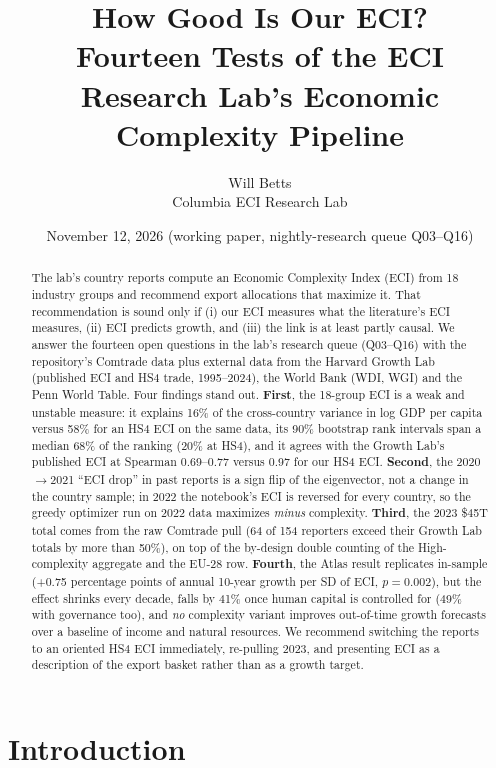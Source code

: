 \documentclass[11pt]{article}
\title{How Good Is Our ECI?\\[4pt]\large Fourteen Tests of the ECI Research Lab's Economic Complexity Pipeline}
\author{Will Betts\\Columbia ECI Research Lab}
\date{November 12, 2026 \quad (working paper, nightly-research queue Q03--Q16)}
\begin{document}
\sloppy
\maketitle

\begin{abstract}
\noindent The lab's country reports compute an Economic Complexity Index (ECI) from 18 industry groups and recommend export allocations that maximize it. That recommendation is sound only if (i) our ECI measures what the literature's ECI measures, (ii) ECI predicts growth, and (iii) the link is at least partly causal. We answer the fourteen open questions in the lab's research queue (Q03--Q16) with the repository's Comtrade data plus external data from the Harvard Growth Lab (published ECI and HS4 trade, 1995--2024), the World Bank (WDI, WGI) and the Penn World Table. Four findings stand out. \textbf{First}, the 18-group ECI is a weak and unstable measure: it explains 16\% of the cross-country variance in log GDP per capita versus 58\% for an HS4 ECI on the same data, its 90\% bootstrap rank intervals span a median 68\% of the ranking (20\% at HS4), and it agrees with the Growth Lab's published ECI at Spearman 0.69--0.77 versus 0.97 for our HS4 ECI. \textbf{Second}, the 2020$\rightarrow$2021 ``ECI drop'' in past reports is a sign flip of the eigenvector, not a change in the country sample; in 2022 the notebook's ECI is reversed for every country, so the greedy optimizer run on 2022 data maximizes \emph{minus} complexity. \textbf{Third}, the 2023 \$45T total comes from the raw Comtrade pull (64 of 154 reporters exceed their Growth Lab totals by more than 50\%), on top of the by-design double counting of the High-complexity aggregate and the EU-28 row. \textbf{Fourth}, the Atlas result replicates in-sample (+0.75 percentage points of annual 10-year growth per SD of ECI, $p=0.002$), but the effect shrinks every decade, falls by 41\% once human capital is controlled for (49\% with governance too), and \emph{no} complexity variant improves out-of-time growth forecasts over a baseline of income and natural resources. We recommend switching the reports to an oriented HS4 ECI immediately, re-pulling 2023, and presenting ECI as a description of the export basket rather than as a growth target.
\end{abstract}

\tableofcontents
\newpage

\section{Introduction}
\end{document}
